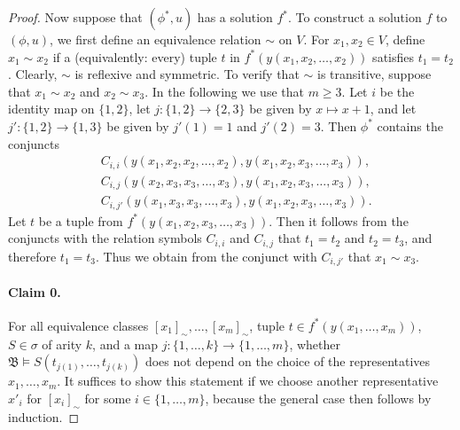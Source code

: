 \documentclass[10pt,a4paper]{amsart}
\newcommand{\bB}{{\mathfrak B}}
\begin{document}
\begin{proof}
Now suppose that $(\phi^*,u)$ has a solution $f^*$. 
To construct a solution $f$ to $(\phi,u)$, we first define an equivalence relation $\sim$
on $V$. For $x_1,x_2 \in V$, define $x_1 \sim x_2$
if a (equivalently: every) tuple $t$ in $f^*(y(x_1,x_2,\dots,x_2))$
satisfies $t_1=t_2$.
Clearly, $\sim$ is reflexive and symmetric.
To verify that $\sim$ is transitive, suppose that 
 $x_1 \sim x_2$ and $x_2 \sim x_3$. 
 In the following we use that $m \geq 3$. 
Let $i$ be the identity map on $\{1,2\}$, 
let $j \colon \{1,2\} \to \{2,3\}$ be given by $x \mapsto x+1$, 
and let $j' \colon \{1,2\} \to \{1,3\}$ be given by $j'(1) = 1$ and $j'(2) = 3$. Then $\phi^*$ contains the conjuncts 
\begin{align*}
    & C_{i, i}(y(x_1, x_2, x_2, \dots, x_2), y(x_1,x_2,x_3,\dots,x_3)),\\ & C_{i, j}(y(x_2,x_3,x_3,\dots,x_3),y(x_1,x_2,x_3,\dots,x_3)), \\ 
    & C_{i, j'}(y(x_1,x_3,x_3,\dots,x_3),y(x_1,x_2,x_3,\dots,x_3)). 
\end{align*}
Let $t$ be a tuple from $f^*(y(x_1,x_2,x_3,\dots,x_3))$. 
Then it follows from the conjuncts with the relation symbols $C_{i,i}$ and $C_{i,j}$ that $t_1=t_2$ and $t_2=t_3$, and therefore $t_1=t_3$. Thus we obtain from the conjunct with $C_{i, j'}$ that $x_1 \sim x_3$. 

\paragraph{Claim 0.} For all equivalence classes $[x_1]_\sim,\dots,[x_m]_\sim$, tuple $t \in f^*(y(x_1,\dots,x_m))$, $S \in \sigma$ of arity $k$, and a map $j \colon \{1, \dots, k\} \rightarrow \{1, \dots, m\}$,
whether 
$\bB \models S(t_{j(1)},\dots,t_{j(k)})$ does not depend on the choice of the representatives $x_{1},\dots,x_{m}$. 
It suffices to show this statement if we choose another representative $x'_i$ for $[x_i]_\sim$ for some $i \in \{1, \dots, m\}$, because the general case then follows by induction. 


\end{proof}
\end{document}
